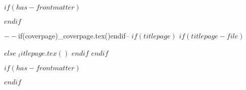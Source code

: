 
$if(has-frontmatter)$
  \begin{frontmatter}
$endif$

\begin{titlepage}
$-- %
$if(coverpage)$
$_coverpage.tex()$
$endif$

$-- %
$if(titlepage)$
$if(titlepage-file)$

$else$
$_titlepage.tex()$
$endif$
$endif$
\end{titlepage}
\setcounter{page}{1}
$if(has-frontmatter)$
\end{frontmatter}
$endif$

